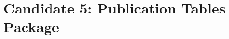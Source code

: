 \documentclass{article}
\begin{document}
\section*{Candidate 5: Publication Tables Package}


\clearpage

\vspace{1em}

\clearpage

\vspace{1em}

\clearpage

\clearpage

\clearpage

\end{document}
